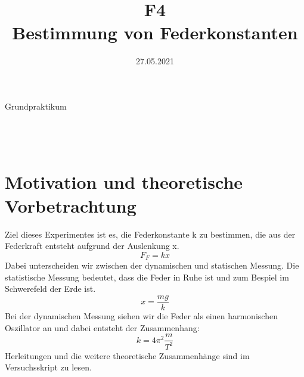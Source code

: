 \documentclass[bibliography=totocnumbered]{scrartcl}
\title{F4 \\ Bestimmung von Federkonstanten}
\date{27.05.2021}
\begin{document}
	\begin{titlepage}
		\begin{center}
			{\huge{Grundpraktikum}}\\\vspace*{15mm}
			{\huge{\textbf{\thetitle}}}\\\vspace*{20mm}
			{\theauthor}\\\vspace*{10mm}
			{\thedate}\\\vspace*{40mm}
			
			
			
		\end{center}
	\end{titlepage}
	\makeatother
	\restoregeometry
	\newpage
	
	\tableofcontents
	\newpage
	
	\listoffigures 
	\listoftables
	\newpage
	
	
	
	\section{Motivation und theoretische Vorbetrachtung}
	Ziel dieses Experimentes ist es, die Federkonstante k zu bestimmen, die aus der Federkraft entsteht aufgrund der Auslenkung x.
	\begin{equation}\label{eq: Federkraftglg}
		F_{F}=kx
	\end{equation}
	Dabei unterscheiden wir zwischen der dynamischen und statischen Messung. Die statistische Messung bedeutet, dass die Feder in Ruhe ist und zum Bespiel im Schwerefeld der Erde ist.
	\begin{equation}\label{eq: statisch Messung}
		x=\dfrac{mg}{k}
	\end{equation}
	Bei der dynamischen Messung siehen wir die Feder als einen harmonischen Oszillator an und dabei entsteht der Zusammenhang:
	\begin{equation}\label{eq: dynamische Messung}
		k=4\pi^{2} \dfrac{m}{T^{2}}
	\end{equation}
	Herleitungen und die weitere theoretische Zusammenhänge sind im Versuchsskript\smartcite{Muller.b} zu lesen.
	
\end{document}
